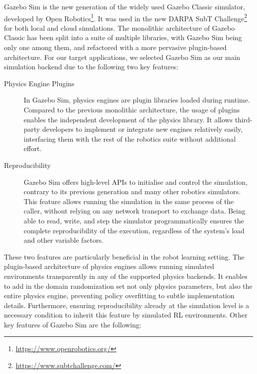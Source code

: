 Gazebo Sim is the new generation of the widely used Gazebo Classic simulator, developed by Open Robotics\footnote{\url{https://www.openrobotics.org/}}.
It was used in the new {\small DARPA} SubT Challenge\footnote{\url{https://www.subtchallenge.com/}} for both local and cloud simulations.
The monolithic architecture of Gazebo Classic has been split into a suite of multiple libraries, with Gazebo Sim being only one among them, and refactored with a more pervasive plugin-based architecture.
For our target applications, we selected Gazebo Sim as our main simulation backend due to the following two key features:
%
\begin{description}
%
\item[Physics Engine Plugins]
In Gazebo Sim, physics engines are plugin libraries loaded during runtime.
Compared to the previous monolithic architecture, the usage of plugins enables the independent development of the physics library.
It allows third-party developers to implement or integrate new engines relatively easily, interfacing them with the rest of the robotics suite without additional effort.
%
\item[Reproducibility]
Gazebo Sim offers high-level \cpp \acp{API} to initialise and control the simulation, contrary to its previous generation and many other robotics simulators.
This feature allows running the simulation in the same process of the caller, without relying on any network transport to exchange data.
Being able to read, write, and step the simulator programmatically ensures the complete reproducibility of the execution, regardless of the system's load and other variable factors.
%
\end{description}
%
These two features are particularly beneficial in the robot learning setting.
The plugin-based architecture of physics engines allows running simulated environments transparently in any of the supported physics backends.
It enables to add in the domain randomization set not only physics parameters, but also the entire physics engine, preventing policy overfitting to subtle implementation details.
Furthermore, ensuring reproducibility already at the simulation level is a necessary condition to inherit this feature by simulated \ac{RL} environments.
%
Other key features of Gazebo Sim are the following:
%
